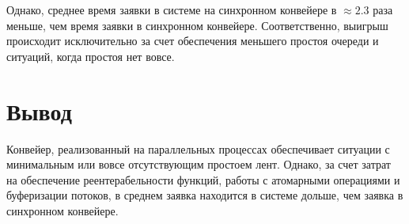 Однако, среднее время заявки в системе на синхронном конвейере в $\approx2.3$ раза меньше, чем время заявки в синхронном конвейере. Соответственно, выигрыш происходит исключительно за счет обеспечения меньшего простоя очереди и ситуаций, когда простоя нет вовсе.


\section{Вывод}\label{sec:exp-sum}
Конвейер, реализованный на параллельных процессах обеспечивает ситуации с минимальным или вовсе отсутствующим простоем лент. Однако, за счет затрат на обеспечение реентерабельности функций, работы с атомарными операциями и буферизации потоков, в среднем заявка находится в системе дольше, чем заявка в синхронном конвейере.   